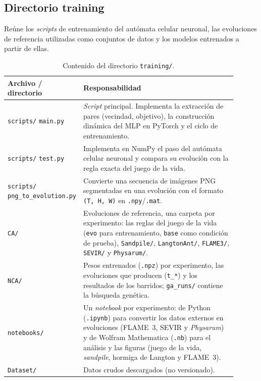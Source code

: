 \subsection{Directorio training}

Reúne los \textit{scripts} de entrenamiento del autómata celular neuronal, las evoluciones de referencia utilizadas como conjuntos de datos y los modelos entrenados a partir de ellas.

\begin{table}[H]
    \centering
    \begin{tabular}{p{0.2\linewidth}|p{0.7\linewidth}}
        \hline
        \textbf{Archivo /}   \quad \textbf{directorio} & \textbf{Responsabilidad} \\ \hline
        \texttt{scripts/} \texttt{main.py} & \textit{Script} principal. Implementa la extracción de pares (vecindad, objetivo), la construcción dinámica del MLP en PyTorch y el ciclo de entrenamiento. \\ \hline
        \texttt{scripts/} \texttt{test.py} & Implementa en NumPy el paso del autómata celular neuronal y compara su evolución con la regla exacta del juego de la vida. \\ \hline
        \texttt{scripts/} \texttt{png\_to\_\allowbreak evolution.py} & Convierte una secuencia de imágenes PNG segmentadas en una evolución con el formato \texttt{(T, H, W)} en \texttt{.npy}/\texttt{.mat}. \\ \hline
        \texttt{CA/} & Evoluciones de referencia, una carpeta por experimento: las reglas del juego de la vida (\texttt{evo} para entrenamiento, \texttt{base} como condición de prueba), \texttt{Sandpile/}, \texttt{LangtonAnt/}, \texttt{FLAME3/}, \texttt{SEVIR/} y \texttt{Physarum/}. \\ \hline
        \texttt{NCA/} & Pesos entrenados (\texttt{.npz}) por experimento, las evoluciones que producen (\texttt{t\_*}) y los resultados de los barridos; \texttt{ga\_runs/} contiene la búsqueda genética. \\ \hline
        \texttt{notebooks/} & Un \textit{notebook} por experimento: de Python (\texttt{.ipynb}) para convertir los datos externos en evoluciones (FLAME~3, SEVIR y \textit{Physarum}) y de Wolfram Mathematica (\texttt{.nb}) para el análisis y las figuras (juego de la vida, \textit{sandpile}, hormiga de Langton y FLAME~3). \\ \hline
        \texttt{Dataset/} & Datos crudos descargados (no versionado). \\ \hline
    \end{tabular}
    \caption{Contenido del directorio \texttt{training/}.}
\end{table}

